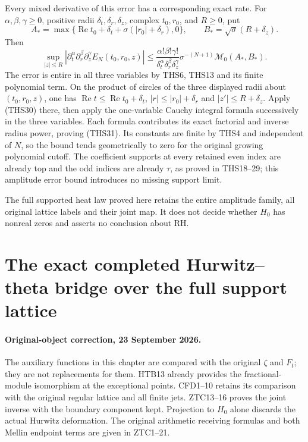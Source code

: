 \documentclass[11pt]{article}
\theoremstyle{definition}
\begin{document}
Every mixed derivative of this error has a corresponding exact
rate. For $\alpha,\beta,\gamma\ge0$, positive radii
$\delta_t,\delta_r,\delta_z$, complex $t_0,r_0$, and $R\ge0$,
put
\[
 A_*=\max\{\operatorname{Re}t_0+\delta_t
                 +\sigma(|r_0|+\delta_r),0\},\qquad
 B_*=\sqrt\sigma(R+\delta_z).
\]
Then
\begin{equation}\tag{THS31}
 \sup_{|z|\le R}
 |\partial_t^\alpha\partial_r^\beta\partial_z^\gamma
                  E_N(t_0,r_0,z)|
 \le
 \frac{\alpha!\beta!\gamma!}
      {\delta_t^\alpha\delta_r^\beta\delta_z^\gamma}
       \sigma^{-(N+1)}\mathcal M_0(A_*,B_*).
\end{equation}
The error is entire in all three variables by THS6, THS13
and its finite polynomial term. On the product of circles of
the three displayed radii about $(t_0,r_0,z)$, one has
$\operatorname{Re}t\le\operatorname{Re}t_0+\delta_t$,
$|r|\le|r_0|+\delta_r$ and $|z'|\le R+\delta_z$.
Apply (THS30) there, then apply the one-variable Cauchy
integral formula successively in the three variables. Each
formula contributes its exact factorial and inverse radius
power, proving (THS31). Its constants are finite by THS4 and
independent of $N$, so the bound tends geometrically to zero
for the original growing polynomial cutoff. The coefficient
supports at every retained even index are already top and
the odd indices are already $\tau$, as proved in THS18--29;
this amplitude error bound introduces no missing support limit.

The full supported heat law proved here retains the entire
amplitude family, all original lattice labels and their joint
map. It does not decide whether $H_0$ has nonreal zeros and
asserts no conclusion about RH.

\clearpage

\section{The exact completed Hurwitz--theta bridge over the full support lattice}
\label{sec:completed-hurwitz-theta-bridge}

\paragraph{Original-object correction, 23 September 2026.}
The auxiliary functions in this chapter are compared with the original
$\zeta$ and $F_t$; they are not replacements for them. HTB13 already
provides the fractional-module isomorphism at the exceptional points.
CFD1--10 retains its comparison with the original regular lattice and
all finite jets. ZTC13--16 proves the joint inverse with the boundary
component kept. Projection to $H_0$ alone discards the actual Hurwitz
deformation. The original arithmetic receiving formulas and both
Mellin endpoint terms are given in ZTC1--21.
\end{document}
